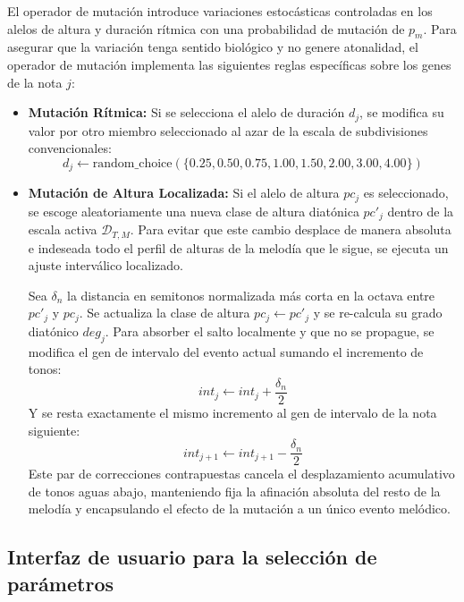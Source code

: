 El operador de mutación introduce variaciones estocásticas controladas en los alelos de altura y duración rítmica con una probabilidad de mutación de $p_m$. Para asegurar que la variación tenga sentido biológico y no genere atonalidad, el operador de mutación implementa las siguientes reglas específicas sobre los genes de la nota $j$:
\begin{itemize}
    \item \textbf{Mutación Rítmica:} Si se selecciona el alelo de duración $d_j$, se modifica su valor por otro miembro seleccionado al azar de la escala de subdivisiones convencionales:
    \begin{equation}
        d_j \leftarrow \text{random\_choice}(\{0.25, 0.50, 0.75, 1.00, 1.50, 2.00, 3.00, 4.00\})
    \end{equation}
    \item \textbf{Mutación de Altura Localizada:} Si el alelo de altura $pc_j$ es seleccionado, se escoge aleatoriamente una nueva clase de altura diatónica $pc'_j$ dentro de la escala activa $\mathcal{D}_{T,M}$. Para evitar que este cambio desplace de manera absoluta e indeseada todo el perfil de alturas de la melodía que le sigue, se ejecuta un ajuste interválico localizado. 
    
    Sea $\delta_n$ la distancia en semitonos normalizada más corta en la octava entre $pc'_j$ y $pc_j$. Se actualiza la clase de altura $pc_j \leftarrow pc'_j$ y se re-calcula su grado diatónico $deg_j$. Para absorber el salto localmente y que no se propague, se modifica el gen de intervalo del evento actual sumando el incremento de tonos:
    \begin{equation}
        int_j \leftarrow int_j + \frac{\delta_n}{2}
    \end{equation}
    Y se resta exactamente el mismo incremento al gen de intervalo de la nota siguiente:
    \begin{equation}
        int_{j+1} \leftarrow int_{j+1} - \frac{\delta_n}{2}
    \end{equation}
    Este par de correcciones contrapuestas cancela el desplazamiento acumulativo de tonos aguas abajo, manteniendo fija la afinación absoluta del resto de la melodía y encapsulando el efecto de la mutación a un único evento melódico.
\end{itemize}

\subsection{Interfaz de usuario para la selección de parámetros}

